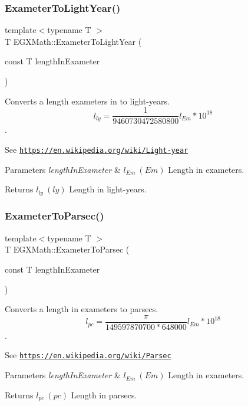 \subsubsection{\texorpdfstring{Exameter\+To\+Light\+Year()}{ExameterToLightYear()}}
{\footnotesize\ttfamily template$<$typename T $>$ \\
T E\+G\+X\+Math\+::\+Exameter\+To\+Light\+Year (\begin{DoxyParamCaption}\item[{const T}]{length\+In\+Exameter }\end{DoxyParamCaption})}



Converts a length exameters in to light-\/years. \[ l_{ly}= \frac{1}{9460730472580800} l_{Em} * 10^{18} \]. 

See \href{https://en.wikipedia.org/wiki/Light-year}{\tt https\+://en.\+wikipedia.\+org/wiki/\+Light-\/year} 
\begin{DoxyParams}{Parameters}
{\em length\+In\+Exameter} & $ l_{Em}\ (Em)$ Length in exameters. \\
\hline
\end{DoxyParams}
\begin{DoxyReturn}{Returns}
$ l_{ly}\ (ly)$ Length in light-\/years. 
\end{DoxyReturn}
\mbox{\label{group___e_g_x_math-_conversions-_length_conversions-_s_i-_exameter-_astronomical_ga807fef0b23d3c3c9b4a11c26bcd36b6e}} 
\subsubsection{\texorpdfstring{Exameter\+To\+Parsec()}{ExameterToParsec()}}
{\footnotesize\ttfamily template$<$typename T $>$ \\
T E\+G\+X\+Math\+::\+Exameter\+To\+Parsec (\begin{DoxyParamCaption}\item[{const T}]{length\+In\+Exameter }\end{DoxyParamCaption})}



Converts a length in exameters to parsecs. \[ l_{pc}=\frac{\pi}{149597870700 * 648000} l_{Em} * 10^{18} \]. 

See \href{https://en.wikipedia.org/wiki/Parsec}{\tt https\+://en.\+wikipedia.\+org/wiki/\+Parsec} 
\begin{DoxyParams}{Parameters}
{\em length\+In\+Exameter} & $ l_{Em}\ (Em)$ Length in exameters. \\
\hline
\end{DoxyParams}
\begin{DoxyReturn}{Returns}
$ l_{pc}\ (pc)$ Length in parsecs. 
\end{DoxyReturn}
